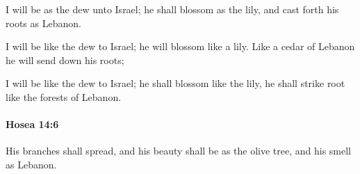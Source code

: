 			\begin{versebox}
					\item[BHS] 
					\item[LXX] 
					\item[ASV] I will be as the dew unto Israel; he shall blossom as the lily, and cast forth his roots as Lebanon.
					\item[NIV] I will be like the dew to Israel; he will blossom like a lily. Like a cedar of Lebanon he will send down his roots;
					\item[NRSV] I will be like the dew to Israel; he shall blossom like the lily, he shall strike root like the forests of Lebanon.
			\end{versebox}

		\paragraph{Hosea 14:6} %
			\label{HOSEA-14-6}

			His branches shall spread, and his beauty shall be as the olive tree, and his smell as Lebanon.

